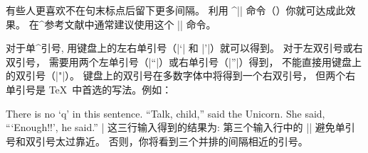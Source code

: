 有些人更喜欢不在句末标点后留下更多间隔。
利用 ^|\frenchspacing| 命令（\xref\frenchspacing ）你就可达成此效果。
在^{参考文献}中通常建议使用这个 |\frenchspacing| 命令。

对于单^{引号}, 用键盘上的左右单引号（|`| 和 |'|）就可以得到。
对于左双引号或右双引号，
需要用两个左单引号（|``|）或右单引号（|''|）得到，
不能直接用键盘上的双引号（|"|）。
键盘上的双引号在多数字体中将得到一个右双引号，
但两个右单引号是 \TeX\ 中首选的写法。例如：

\vbox{%
\csdisplay
There is no `q' in this sentence.
``Talk, child,'' said the Unicorn.
She said, ``\thinspace`Enough!!', he said.''
|
}%
这三行输入得到的结果为:
\noindent
第三个输入行中的 |\thinspace| 避免单引号和双引号太过靠近。
否则，你将看到三个并排的间隔相近的引号。

